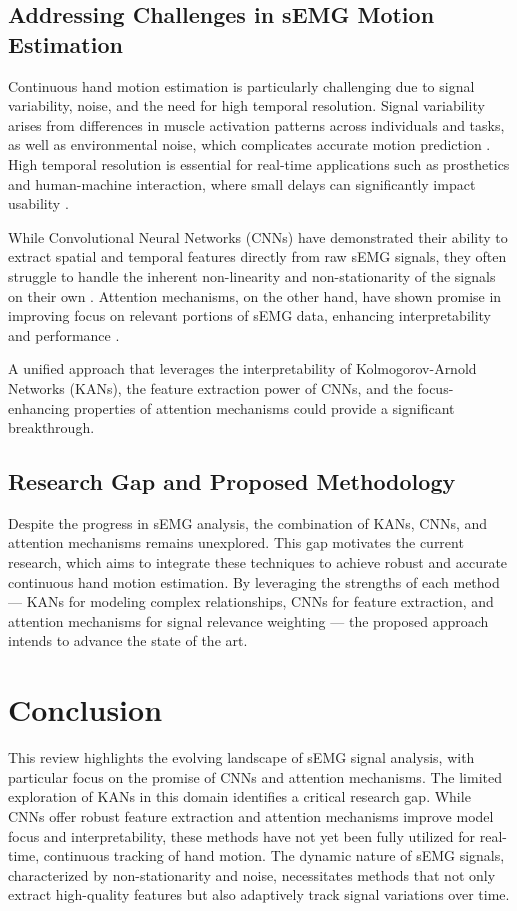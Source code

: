 \subsection{Addressing Challenges in sEMG Motion Estimation}
Continuous hand motion estimation is particularly challenging due to signal variability, noise, and the need for high temporal resolution. Signal variability arises from differences in muscle activation patterns across individuals and tasks, as well as environmental noise, which complicates accurate motion prediction \cite{farago2022review}. High temporal resolution is essential for real-time applications such as prosthetics and human-machine interaction, where small delays can significantly impact usability \cite{oskoei2007myoelectric}.

While Convolutional Neural Networks (CNNs) have demonstrated their ability to extract spatial and temporal features directly from raw sEMG signals, they often struggle to handle the inherent non-linearity and non-stationarity of the signals on their own \cite{ameri2019regression}. Attention mechanisms, on the other hand, have shown promise in improving focus on relevant portions of sEMG data, enhancing interpretability and performance \cite{zhang2023lstm,lee2022explainable}.

A unified approach that leverages the interpretability of Kolmogorov-Arnold Networks (KANs), the feature extraction power of CNNs, and the focus-enhancing properties of attention mechanisms could provide a significant breakthrough.

\subsection{Research Gap and Proposed Methodology}
Despite the progress in sEMG analysis, the combination of KANs, CNNs, and attention mechanisms remains unexplored. This gap motivates the current research, which aims to integrate these techniques to achieve robust and accurate continuous hand motion estimation. By leveraging the strengths of each method — KANs for modeling complex relationships, CNNs for feature extraction, and attention mechanisms for signal relevance weighting — the proposed approach intends to advance the state of the art.

\section{Conclusion}
This review highlights the evolving landscape of sEMG signal analysis, with particular focus on the promise of CNNs and attention mechanisms. The limited exploration of KANs in this domain identifies a critical research gap. While CNNs offer robust feature extraction and attention mechanisms improve model focus and interpretability, these methods have not yet been fully utilized for real-time, continuous tracking of hand motion. The dynamic nature of sEMG signals, characterized by non-stationarity and noise, necessitates methods that not only extract high-quality features but also adaptively track signal variations over time.

